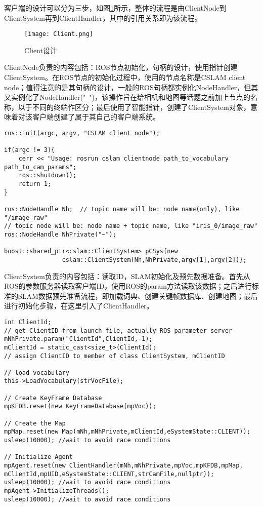 客户端的设计可以分为三步，如图\ref{fig12}所示，整体的流程是由ClientNode到ClientSystem再到ClientHandler，其中的引用关系即为该流程。

\begin{figure}[!ht]
	\centering
	\texttt{[image: Client.png]}
	\caption{Client设计}
	\label{fig12}
\end{figure}

ClientNode负责的内容包括：ROS节点初始化，句柄的设计，使用指针创建ClientSystem。在ROS节点的初始化过程中，使用的节点名称是CSLAM client node；值得注意的是其句柄的设计，一般的ROS句柄都实例化NodeHandler，但其又实例化了NodeHandler("~")，该操作旨在给相机和地图等话题之前加上节点的名称，以于不同的终端作区分；最后使用了智能指针，创建了ClientSystem对象，意味着对该客户端创建了属于其自己的客户端系统。

\begin{verbatim}
ros::init(argc, argv, "CSLAM client node");

if(argc != 3){
    cerr << "Usage: rosrun cslam clientnode path_to_vocabulary path_to_cam_params";
    ros::shutdown();
    return 1;
}

ros::NodeHandle Nh;  // topic name will be: node name(only), like "/image_raw"
// topic node will be: node name + topic name, like "iris_0/image_raw"
ros::NodeHandle NhPrivate("~"); 

boost::shared_ptr<cslam::ClientSystem> pCSys{new
                cslam::ClientSystem(Nh,NhPrivate,argv[1],argv[2])};
\end{verbatim}

ClientSystem负责的内容包括：读取ID，SLAM初始化及预先数据准备。首先从ROS的参数服务器读取客户端ID，使用ROS的param方法读取该数据；之后进行标准的SLAM数据预先准备流程，即加载词典、创建关键帧数据库、创建地图；最后进行初始化步骤，在这里引入了ClientHandler。

\begin{verbatim}
int ClientId;
// get ClientID from launch file, actually ROS parameter server
mNhPrivate.param("ClientId",ClientId,-1);
mClientId = static_cast<size_t>(ClientId);
// assign ClientID to member of class ClientSystem, mClientID

// load vocabulary
this->LoadVocabulary(strVocFile);

// Create KeyFrame Database
mpKFDB.reset(new KeyFrameDatabase(mpVoc));

// Create the Map
mpMap.reset(new Map(mNh,mNhPrivate,mClientId,eSystemState::CLIENT));
usleep(10000); //wait to avoid race conditions

// Initialize Agent
mpAgent.reset(new ClientHandler(mNh,mNhPrivate,mpVoc,mpKFDB,mpMap,
mClientId,mpUID,eSystemState::CLIENT,strCamFile,nullptr));
usleep(10000); //wait to avoid race conditions
mpAgent->InitializeThreads();
usleep(10000); //wait to avoid race conditions
\end{verbatim}

